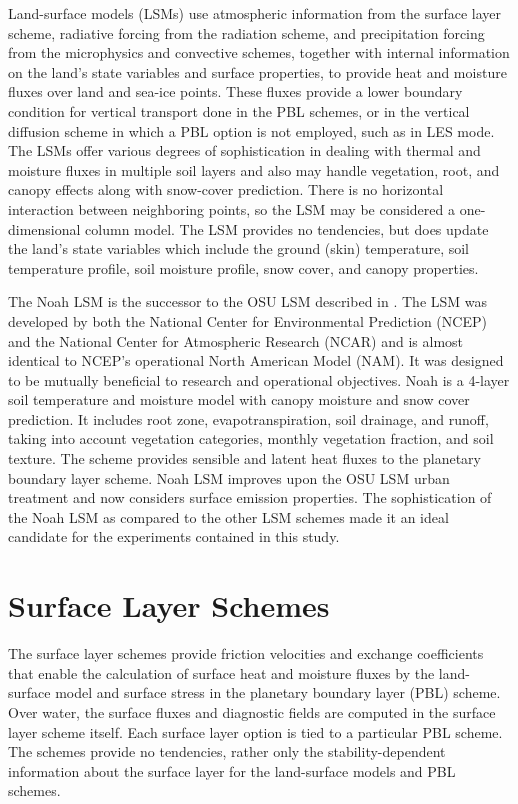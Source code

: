 Land-surface models (LSMs) use atmospheric information from the surface layer scheme, radiative forcing from the radiation scheme, and precipitation forcing from the microphysics and convective schemes, together with internal information on the land's state variables and surface properties, to provide heat and moisture fluxes over land and sea-ice points. These fluxes provide a lower boundary condition for vertical transport done in the PBL schemes, or in the vertical diffusion scheme in which a PBL option is not employed, such as in LES mode. The LSMs offer various degrees of sophistication in dealing with thermal and moisture fluxes in multiple soil layers and also may handle vegetation, root, and canopy effects along with snow-cover prediction. There is no horizontal interaction between neighboring points, so the LSM may be considered a one-dimensional column model. The LSM provides no tendencies, but does update the land's state variables which include the ground (skin) temperature, soil temperature profile, soil moisture profile, snow cover, and canopy properties.

The Noah LSM is the successor to the OSU LSM described in  \citet{ChenDud}. The LSM was developed by both the National Center for Environmental Prediction (NCEP) and the National Center for Atmospheric Research (NCAR) and is almost identical to NCEP's operational North American Model (NAM). It was designed to be mutually beneficial to research and operational objectives. Noah is a 4-layer soil temperature and moisture model with canopy moisture and snow cover prediction. It includes root zone, evapotranspiration, soil drainage, and runoff, taking into account vegetation categories, monthly vegetation fraction, and soil texture. The scheme provides sensible and latent heat fluxes to the planetary boundary layer scheme. Noah LSM improves upon the OSU LSM urban treatment and now considers surface emission properties. The sophistication of the Noah LSM as compared to the other LSM schemes made it an ideal candidate for the experiments contained in this study.

\section{Surface Layer Schemes}
\label{surface-layer-35}

The surface layer schemes provide friction velocities and exchange coefficients that enable the calculation of surface heat and moisture fluxes by the land-surface model and surface stress in the planetary boundary layer (PBL) scheme. Over water, the surface fluxes and diagnostic fields are computed in the surface layer scheme itself. Each surface layer option is tied to a particular PBL scheme. The schemes provide no tendencies, rather only the stability-dependent information about the surface layer for the land-surface models and PBL schemes.

